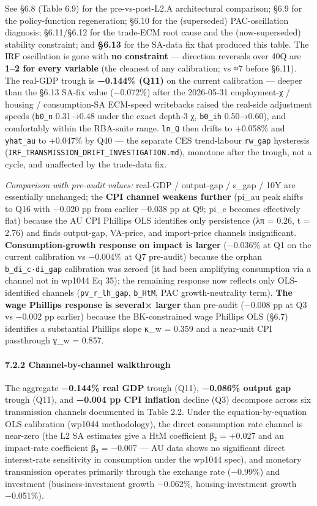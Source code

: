 \documentclass[
]{article}
\begin{document}
See §6.8 (Table 6.9) for the pre-vs-post-L2.A architectural comparison;
§6.9 for the policy-function regeneration; §6.10 for the (superseded)
PAC-oscillation diagnosis; §6.11/§6.12 for the trade-ECM root cause and
the (now-superseded) stability constraint; and \textbf{§6.13} for the
SA-data fix that produced this table. The IRF oscillation is gone with
\textbf{no constraint} --- direction reversals over 40Q are \textbf{1--2
for every variable} (the cleanest of any calibration; vs ≈7 before
§6.11). The real-GDP trough is \textbf{−0.144\% (Q11)} on the current
calibration --- deeper than the §6.13 SA-fix value (−0.072\%) after the
2026-05-31 employment-χ / housing / consumption-SA ECM-speed writebacks
raised the real-side adjustment speeds (\texttt{b0\_n} 0.31→0.48 under
the exact depth-3 χ, \texttt{b0\_ih} 0.50→0.60), and comfortably within
the RBA-suite range. \texttt{ln\_Q} then drifts to +0.058\% and
\texttt{yhat\_au} to +0.047\% by Q40 --- the separate CES trend-labour
\texttt{rw\_gap} hysteresis
(\texttt{IRF\_TRANSMISSION\_DRIFT\_INVESTIGATION.md}), monotone after
the trough, not a cycle, and unaffected by the trade-data fix.

\emph{Comparison with pre-audit values:} real-GDP / output-gap / s\_gap
/ 10Y are essentially unchanged; the \textbf{CPI channel weakens
further} (pi\_au peak shifts to Q16 with −0.020 pp from earlier −0.038
pp at Q9; pi\_c becomes effectively flat) because the AU CPI Phillips
OLS identifies only persistence (λπ = 0.26, t = 2.76) and finds
output-gap, VA-price, and import-price channels insignificant.
\textbf{Consumption-growth response on impact is larger} (−0.036\% at Q1
on the current calibration vs −0.004\% at Q7 pre-audit) because the
orphan \texttt{b\_di\_c·di\_gap} calibration was zeroed (it had been
amplifying consumption via a channel not in wp1044 Eq 35); the remaining
response now reflects only OLS-identified channels
(\texttt{pv\_r\_lh\_gap}, \texttt{b\_HtM}, PAC growth-neutrality term).
\textbf{The wage Phillips response is several× larger} than pre-audit
(−0.008 pp at Q3 vs −0.002 pp earlier) because the BK-constrained wage
Phillips OLS (§6.7) identifies a substantial Phillips slope κ\_w = 0.359
and a near-unit CPI passthrough γ\_w = 0.857.

\paragraph{7.2.2 Channel-by-channel
walkthrough}\label{channel-by-channel-walkthrough}

The aggregate \textbf{−0.144\% real GDP} trough (Q11), \textbf{−0.086\%
output gap} trough (Q11), and \textbf{−0.004 pp CPI inflation} decline
(Q3) decompose across six transmission channels documented in Table 2.2.
Under the equation-by-equation OLS calibration (wp1044 methodology), the
direct consumption rate channel is near-zero (the L2 SA estimates give a
HtM coefficient β₂ = +0.027 and an impact-rate coefficient β₃ = −0.007
--- AU data shows no significant direct interest-rate sensitivity in
consumption under the wp1044 spec), and monetary transmission operates
primarily through the exchange rate (−0.99\%) and investment
(business-investment growth −0.062\%, housing-investment growth
−0.051\%).
\end{document}
